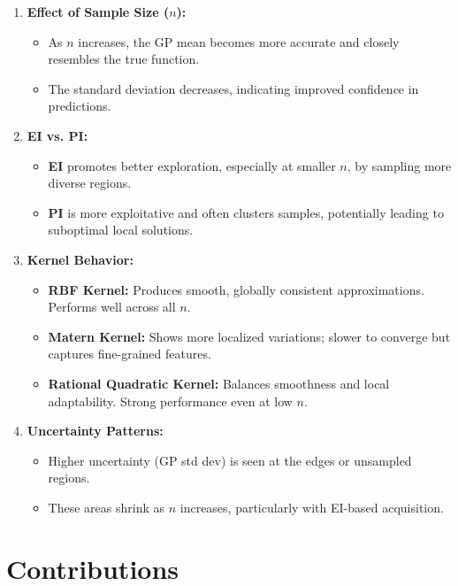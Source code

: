 \documentclass[11pt]{article}
\begin{document}
\begin{enumerate}
    \item \textbf{Effect of Sample Size ($n$):}
    \begin{itemize}
        \item As $n$ increases, the GP mean becomes more accurate and closely resembles the true function.
        \item The standard deviation decreases, indicating improved confidence in predictions.
    \end{itemize}

    \item \textbf{EI vs. PI:}
    \begin{itemize}
        \item \textbf{EI} promotes better exploration, especially at smaller $n$, by sampling more diverse regions.
        \item \textbf{PI} is more exploitative and often clusters samples, potentially leading to suboptimal local solutions.
    \end{itemize}

    \item \textbf{Kernel Behavior:}
    \begin{itemize}
        \item \textbf{RBF Kernel:} Produces smooth, globally consistent approximations. Performs well across all $n$.
        \item \textbf{Matern Kernel:} Shows more localized variations; slower to converge but captures fine-grained features.
        \item \textbf{Rational Quadratic Kernel:} Balances smoothness and local adaptability. Strong performance even at low $n$.
    \end{itemize}

    \item \textbf{Uncertainty Patterns:}
    \begin{itemize}
        \item Higher uncertainty (GP std dev) is seen at the edges or unsampled regions.
        \item These areas shrink as $n$ increases, particularly with EI-based acquisition.
    \end{itemize}
\end{enumerate}

\section*{Contributions}
\end{document}
